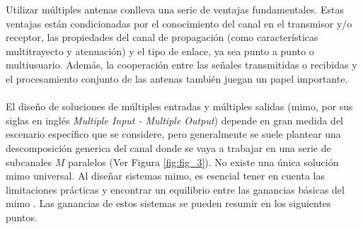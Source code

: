 Utilizar múltiples antenas conlleva una serie de ventajas fundamentales. Estas ventajas están condicionadas por el conocimiento del canal en el transmisor y/o receptor, las propiedades del canal de propagación (como características multitrayecto y atenuación) y el tipo de enlace, ya sea punto a punto o multiusuario. Además, la cooperación entre las señales transmitidas o recibidas y el procesamiento conjunto de las antenas también juegan un papel importante.\\
\\
El diseño de soluciones de múltiples entradas y múltiples salidas (\gls{mimo}, por sus siglas en inglés \textit{Multiple Input - Multiple Output}) depende en gran medida del escenario específico que se considere, pero generalmente se suele plantear una descomposición generica del canal donde se vaya a trabajar en una serie de subcanales $M$ paralelos (Ver Figura \ref{fig:fig_3}). No existe una única solución \gls{mimo} universal. Al diseñar sistemas \gls{mimo}, es esencial tener en cuenta las limitaciones prácticas y encontrar un equilibrio entre las ganancias básicas del \gls{mimo} \cite{ordonez2011fundamental}. Las ganancias de estos sistemas se pueden resumir en los siguientes puntos.

